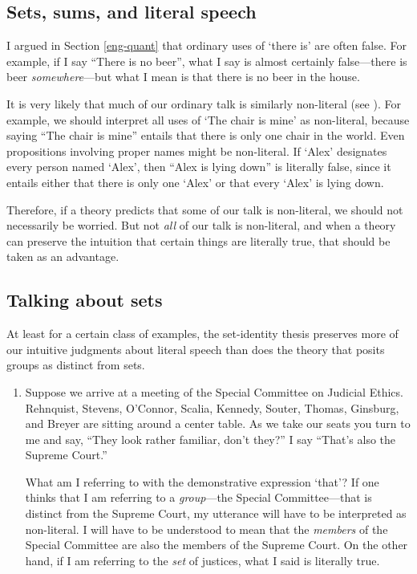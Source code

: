 \documentclass[11pt]{article}
\begin{document}
\begin{spacing}{1.5}
\section{Sets, sums, and literal speech}
\label{talk}
I argued in Section \ref{eng-quant} that ordinary uses of `there is'
are often false.  For example, if I say ``There is no beer'', what I
say is almost certainly false---there is beer {\em somewhere}---but
what I mean is that there is no beer in the house.

It is very likely that much of our ordinary talk is similarly
non-literal (see \citet{bach1987}).  For example, we should interpret
all uses of `The chair is mine' as non-literal, because saying ``The
chair is mine'' entails that there is only one chair in the world.
Even propositions involving proper names might be non-literal.  If
`Alex' designates every person named `Alex', then ``Alex is lying
down'' is literally false, since it entails either that there is only
one `Alex' or that every `Alex' is lying down.

Therefore, if a theory predicts that some of our talk is non-literal,
we should not necessarily be worried.  But not {\em all} of our talk
is non-literal, and when a theory can preserve the intuition that
certain things are literally true, that should be taken as an
advantage.

\subsection{Talking about sets}
\label{sets-talk}
At least for a certain class of examples, the set-identity thesis
preserves more of our intuitive judgments about literal speech than
does the theory that posits groups as distinct from sets.

\begin{enumerate}
  \item Suppose we arrive at a meeting of the Special Committee on
    Judicial Ethics.  Rehnquist, Stevens, O'Connor, Scalia, Kennedy,
    Souter, Thomas, Ginsburg, and Breyer are sitting around a center
    table.  As we take our seats you turn to me and say, ``They look
    rather familiar, don't they?''  I say ``That's also the Supreme
    Court.''

    What am I referring to with the demonstrative expression `that'?
    If one thinks that I am referring to a {\em group}---the Special
    Committee---that is distinct from the Supreme Court, my utterance
    will have to be interpreted as non-literal.  I will have to be
    understood to mean that the {\em members} of the Special Committee
    are also the members of the Supreme Court.  On the other hand, if
    I am referring to the {\em set} of justices, what I said is
    literally true.


\end{enumerate}
\end{spacing}
\end{document}
